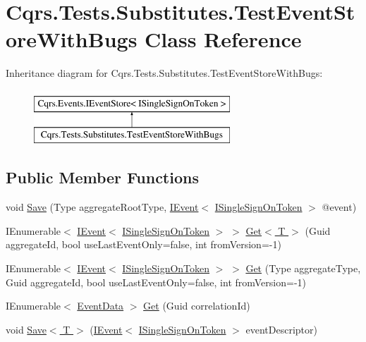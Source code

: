 \hypertarget{classCqrs_1_1Tests_1_1Substitutes_1_1TestEventStoreWithBugs}{}\section{Cqrs.\+Tests.\+Substitutes.\+Test\+Event\+Store\+With\+Bugs Class Reference}
\label{classCqrs_1_1Tests_1_1Substitutes_1_1TestEventStoreWithBugs}
Inheritance diagram for Cqrs.\+Tests.\+Substitutes.\+Test\+Event\+Store\+With\+Bugs\+:\begin{figure}[H]
\begin{center}
\leavevmode
\includegraphics[height=2.000000cm]{classCqrs_1_1Tests_1_1Substitutes_1_1TestEventStoreWithBugs}
\end{center}
\end{figure}
\subsection*{Public Member Functions}
\begin{DoxyCompactItemize}
\item 
void \hyperlink{classCqrs_1_1Tests_1_1Substitutes_1_1TestEventStoreWithBugs_ae2208808270f6f4b20856f04b5693f2c}{Save} (Type aggregate\+Root\+Type, \hyperlink{interfaceCqrs_1_1Events_1_1IEvent}{I\+Event}$<$ \hyperlink{interfaceCqrs_1_1Authentication_1_1ISingleSignOnToken}{I\+Single\+Sign\+On\+Token} $>$ @event)
\item 
I\+Enumerable$<$ \hyperlink{interfaceCqrs_1_1Events_1_1IEvent}{I\+Event}$<$ \hyperlink{interfaceCqrs_1_1Authentication_1_1ISingleSignOnToken}{I\+Single\+Sign\+On\+Token} $>$ $>$ \hyperlink{classCqrs_1_1Tests_1_1Substitutes_1_1TestEventStoreWithBugs_a7b9ba57d07fa9ffc6d404d006e25c2b5}{Get$<$ T $>$} (Guid aggregate\+Id, bool use\+Last\+Event\+Only=false, int from\+Version=-\/1)
\item 
I\+Enumerable$<$ \hyperlink{interfaceCqrs_1_1Events_1_1IEvent}{I\+Event}$<$ \hyperlink{interfaceCqrs_1_1Authentication_1_1ISingleSignOnToken}{I\+Single\+Sign\+On\+Token} $>$ $>$ \hyperlink{classCqrs_1_1Tests_1_1Substitutes_1_1TestEventStoreWithBugs_af0ff73d3f8e8b28574ecef798d0be503}{Get} (Type aggregate\+Type, Guid aggregate\+Id, bool use\+Last\+Event\+Only=false, int from\+Version=-\/1)
\item 
I\+Enumerable$<$ \hyperlink{classCqrs_1_1Events_1_1EventData}{Event\+Data} $>$ \hyperlink{classCqrs_1_1Tests_1_1Substitutes_1_1TestEventStoreWithBugs_a29c1feb49762bd4a85cf69daa4a0f881}{Get} (Guid correlation\+Id)
\item 
void \hyperlink{classCqrs_1_1Tests_1_1Substitutes_1_1TestEventStoreWithBugs_a22ce91768f915a6f01894137dd314c42}{Save$<$ T $>$} (\hyperlink{interfaceCqrs_1_1Events_1_1IEvent}{I\+Event}$<$ \hyperlink{interfaceCqrs_1_1Authentication_1_1ISingleSignOnToken}{I\+Single\+Sign\+On\+Token} $>$ event\+Descriptor)
\end{DoxyCompactItemize}


